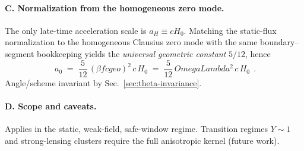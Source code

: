 \documentclass[aps,prd,onecolumn,superscriptaddress,nofootinbib]{revtex4-2}
\def\OmL{OmegaLambda}%
\def\cgeo{cgeo}%
\def\boxed#1{#1}%
\newcommand{\OmL}{\Omega_\Lambda}
\newcommand{\cgeo}{c_{\rm geo}}
\begin{document}
\paragraph*{C. Normalization from the homogeneous zero mode.}
The only late-time acceleration scale is \(a_H\equiv cH_0\). Matching the static-flux normalization to the homogeneous Clausius zero mode with the same boundary–segment bookkeeping yields the \emph{universal geometric constant} \(5/12\), hence
\begin{equation}
\boxed{\ a_0 \;=\; \frac{5}{12}\,(\beta f \cgeo)^2\,c\,H_0 \;=\; \frac{5}{12}\,\OmL^2\,c\,H_0\ }\ .
\end{equation}
Angle/scheme invariant by Sec.~\ref{sec:theta-invariance}.

\paragraph*{D. Scope and caveats.}
Applies in the static, weak-field, safe-window regime. Transition regimes \(Y\!\sim\!1\) and strong-lensing clusters require the full anisotropic kernel (future work).
\end{document}
